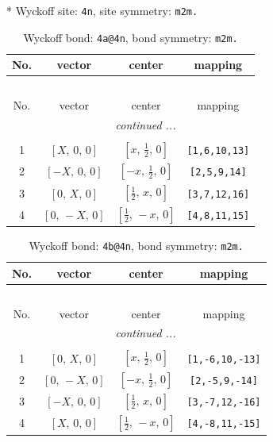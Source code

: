 \documentclass[fleqn,8pt]{jsarticle}
\begin{document}
* Wyckoff site: {\tt 4n}, site symmetry: {\tt m2m.}
\renewcommand{\arraystretch}{1.2}
\begin{longtable}{cccc}
\caption{Wyckoff bond: {\tt 4a@4n}, bond symmetry: {\tt m2m.}}
 \\
 \hline \hline
No. & vector & center & mapping \\ \hline \endfirsthead

\multicolumn{3}{l}{\tablename\ \thetable{}} \\
 \hline \hline
No. & vector & center & mapping \\ \hline \endhead

 \hline \hline
\multicolumn{3}{r}{\footnotesize\it continued ...} \\ \endfoot

 \hline \hline
\multicolumn{3}{r}{} \\ \endlastfoot

1 & $\left[ X,\, 0,\, 0 \right]$ & $\left[ x,\, \frac{1}{2},\, 0 \right]$ & {\tt [1,6,10,13]} \\ \hline
2 & $\left[ - X,\, 0,\, 0 \right]$ & $\left[ - x,\, \frac{1}{2},\, 0 \right]$ & {\tt [2,5,9,14]} \\ \hline
3 & $\left[ 0,\, X,\, 0 \right]$ & $\left[ \frac{1}{2},\, x,\, 0 \right]$ & {\tt [3,7,12,16]} \\ \hline
4 & $\left[ 0,\, - X,\, 0 \right]$ & $\left[ \frac{1}{2},\, - x,\, 0 \right]$ & {\tt [4,8,11,15]} \\
\end{longtable}
\renewcommand{\arraystretch}{1.2}
\begin{longtable}{cccc}
\caption{Wyckoff bond: {\tt 4b@4n}, bond symmetry: {\tt m2m.}}
 \\
 \hline \hline
No. & vector & center & mapping \\ \hline \endfirsthead

\multicolumn{3}{l}{\tablename\ \thetable{}} \\
 \hline \hline
No. & vector & center & mapping \\ \hline \endhead

 \hline \hline
\multicolumn{3}{r}{\footnotesize\it continued ...} \\ \endfoot

 \hline \hline
\multicolumn{3}{r}{} \\ \endlastfoot

1 & $\left[ 0,\, X,\, 0 \right]$ & $\left[ x,\, \frac{1}{2},\, 0 \right]$ & {\tt [1,-6,10,-13]} \\ \hline
2 & $\left[ 0,\, - X,\, 0 \right]$ & $\left[ - x,\, \frac{1}{2},\, 0 \right]$ & {\tt [2,-5,9,-14]} \\ \hline
3 & $\left[ - X,\, 0,\, 0 \right]$ & $\left[ \frac{1}{2},\, x,\, 0 \right]$ & {\tt [3,-7,12,-16]} \\ \hline
4 & $\left[ X,\, 0,\, 0 \right]$ & $\left[ \frac{1}{2},\, - x,\, 0 \right]$ & {\tt [4,-8,11,-15]} \\
\end{longtable}
\end{document}
